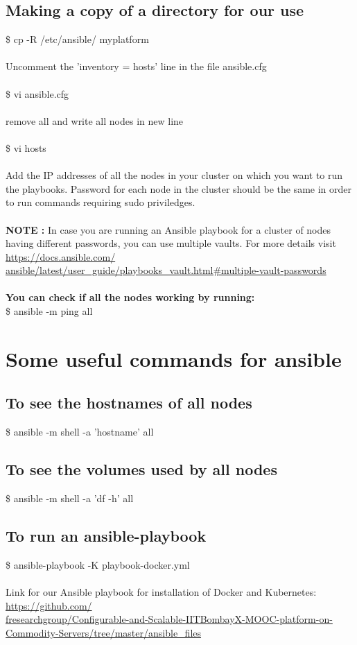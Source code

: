 \documentclass[12pt]{report}
\begin{document}
\subsection{Making a copy of a directory for our use}
\$ cp -R /etc/ansible/ myplatform\\\\
Uncomment the 'inventory = hosts' line in the file ansible.cfg\\\\
\$ vi ansible.cfg \\\\
remove all and write all nodes in new line\\\\
\$ vi hosts \\\\
Add the IP addresses of all the nodes in your cluster on which you want to run the playbooks. Password for each node in the cluster should be the same in order to run commands requiring sudo priviledges.\\\\
\textbf{NOTE :} In case you are running an Ansible playbook for a cluster of nodes having different passwords, you can use multiple vaults. For more details visit \href{https://docs.ansible.com/ansible/latest/user_guide/playbooks_vault.html#multiple-vault-passwords}{https://docs.ansible.com/\\ansible/latest/user\_guide/playbooks\_vault.html\#multiple-vault-passwords}\cite{Ansiblevaults}\\\\ 
\textbf{You can check if all the nodes working by running:}\\
\$ ansible -m ping all
\section{Some useful commands for ansible}
\subsection{To see the hostnames of all nodes}
\$ ansible -m shell -a 'hostname' all
\subsection{To see the volumes used by all nodes}
\$ ansible -m shell -a 'df -h' all
\subsection{To run an ansible-playbook}
\$ ansible-playbook  -K playbook-docker.yml\\\\
Link for our Ansible playbook for installation of Docker and Kubernetes: \href{https://github.com/fresearchgroup/Configurable-and-Scalable-IITBombayX-MOOC-platform-on-Commodity-Servers/tree/master/ansible_files}{https://github.com/\\fresearchgroup/Configurable-and-Scalable-IITBombayX-MOOC-platform-on-Commodity-Servers/tree/master/ansible\_files}\cite{Ansiplay}
\end{document}
